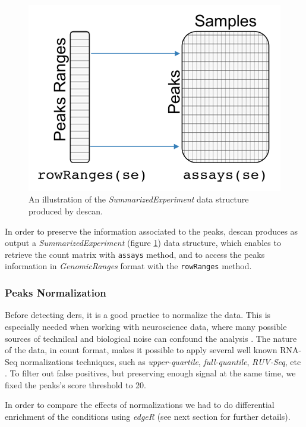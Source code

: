 \begin{figure}[H]
\centering
\includegraphics[scale=.7]{img/descan2/counts.png}
\caption[\gls{descan} counts illustration]{An illustration of the \textit{SummarizedExperiment} data structure produced by \gls{descan}.}
\label{fig:countsdescan}
\centering
\end{figure}

In order to preserve the information associated to the peaks, \gls{descan} produces as output a \textit{SummarizedExperiment} (figure \ref{fig:countsdescan}) data structure, which enables to retrieve the count matrix with \lstinline!assays! method, and to access the peaks information in \textit{GenomicRanges} format with the \lstinline!rowRanges! method.


\subsubsection{Peaks Normalization}

Before detecting \glspl{der}, it is a good practice to normalize the data.
This is especially needed when working with neuroscience data, where many possible sources of technilcal and biological noise can confound the analysis \cite{Peixoto2015}.
The nature of the data, in count format, makes it possible to apply several well known RNA-Seq normalizations techniques, such as \textit{upper-quartile}, \textit{full-quantile}, \textit{RUV-Seq}, etc \cite{Risso2014h, Dillies2013}.
To filter out false positives, but preserving enough signal at the same time, we fixed the peaks's score threshold to 20.

In order to compare the effects of normalizations we had to do differential enrichment of the conditions using \textit{edgeR} (see next section for further details).

